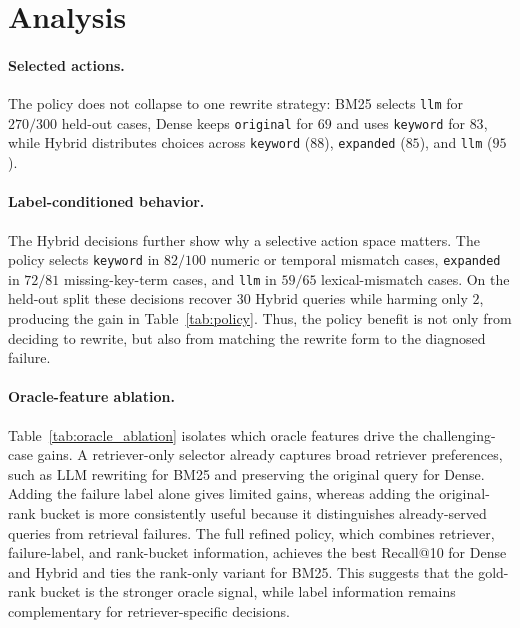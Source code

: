 \documentclass{article}
\begin{document}
\section{Analysis}

\paragraph{Selected actions.}
The policy does not collapse to one rewrite strategy: BM25 selects \texttt{llm}
for $270/300$ held-out cases, Dense keeps \texttt{original} for $69$ and uses
\texttt{keyword} for $83$, while Hybrid distributes choices across
\texttt{keyword} ($88$), \texttt{expanded} ($85$), and \texttt{llm} ($95$).

\paragraph{Label-conditioned behavior.}
The Hybrid decisions further show why a selective action space matters. The
policy selects \texttt{keyword} in $82/100$ numeric or temporal mismatch cases,
\texttt{expanded} in $72/81$ missing-key-term cases, and \texttt{llm} in
$59/65$ lexical-mismatch cases. On the held-out split these decisions recover
$30$ Hybrid queries while harming only $2$, producing the gain in
Table~\ref{tab:policy}. Thus, the policy benefit is not only from deciding to
rewrite, but also from matching the rewrite form to the diagnosed failure.

\paragraph{Oracle-feature ablation.}
Table~\ref{tab:oracle_ablation} isolates which oracle features drive the
challenging-case gains. A retriever-only selector already captures broad
retriever preferences, such as LLM rewriting for BM25 and preserving the
original query for Dense. Adding the failure label alone gives limited gains,
whereas adding the original-rank bucket is more consistently useful because it
distinguishes already-served queries from retrieval failures. The full refined
policy, which combines retriever, failure-label, and rank-bucket information,
achieves the best Recall@10 for Dense and Hybrid and ties the rank-only variant
for BM25. This suggests that the gold-rank bucket is the stronger oracle signal,
while label information remains complementary for retriever-specific decisions.
\end{document}
